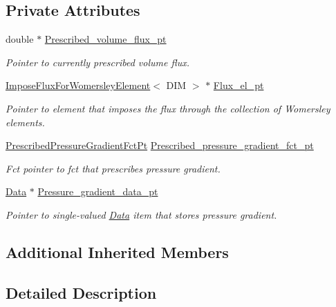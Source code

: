 \subsection*{Private Attributes}
\begin{DoxyCompactItemize}
\item 
double $\ast$ \hyperlink{classoomph_1_1WomersleyProblem_a8880c101a67eb960adac41775ebf2029}{Prescribed\+\_\+volume\+\_\+flux\+\_\+pt}
\begin{DoxyCompactList}\small\item\em Pointer to currently prescribed volume flux. \end{DoxyCompactList}\item 
\hyperlink{classoomph_1_1ImposeFluxForWomersleyElement}{Impose\+Flux\+For\+Womersley\+Element}$<$ D\+IM $>$ $\ast$ \hyperlink{classoomph_1_1WomersleyProblem_a4816844a22263d5f39ff8ca5d2c370ba}{Flux\+\_\+el\+\_\+pt}
\begin{DoxyCompactList}\small\item\em Pointer to element that imposes the flux through the collection of Womersley elements. \end{DoxyCompactList}\item 
\hyperlink{classoomph_1_1WomersleyProblem_ac3607d12a92dede9ed2e93ae64f300b3}{Prescribed\+Pressure\+Gradient\+Fct\+Pt} \hyperlink{classoomph_1_1WomersleyProblem_a54d5137eeb495e40382576392720611f}{Prescribed\+\_\+pressure\+\_\+gradient\+\_\+fct\+\_\+pt}
\begin{DoxyCompactList}\small\item\em Fct pointer to fct that prescribes pressure gradient. \end{DoxyCompactList}\item 
\hyperlink{classoomph_1_1Data}{Data} $\ast$ \hyperlink{classoomph_1_1WomersleyProblem_ad82799a978674bc9f49ac3240d43c34d}{Pressure\+\_\+gradient\+\_\+data\+\_\+pt}
\begin{DoxyCompactList}\small\item\em Pointer to single-\/valued \hyperlink{classoomph_1_1Data}{Data} item that stores pressure gradient. \end{DoxyCompactList}\end{DoxyCompactItemize}
\subsection*{Additional Inherited Members}


\subsection{Detailed Description}
